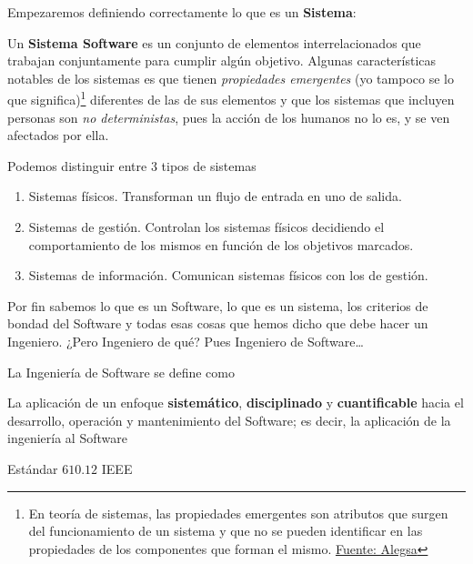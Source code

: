 \noindent Empezaremos definiendo correctamente lo que es un \textbf{Sistema}:

Un \textbf{Sistema Software} es un conjunto de elementos interrelacionados que trabajan conjuntamente para
cumplir algún objetivo. Algunas características notables de los sistemas es que tienen \textit{propiedades
emergentes} (yo tampoco se lo que significa)\footnote{En teoría de sistemas, las propiedades emergentes son 
atributos que surgen del funcionamiento de un sistema y que no se pueden identificar en las propiedades de los
componentes que forman el mismo. \href{https://www.alegsa.com.ar/Dic/propiedad_emergente.php}{Fuente: Alegsa}}
diferentes de las de sus elementos y que los sistemas que incluyen personas son \textit{no deterministas}, pues
la acción de los humanos no lo es, y se ven afectados por ella.

Podemos distinguir entre 3 tipos de sistemas

\begin{enumerate}
    \item Sistemas físicos. Transforman un flujo de entrada en uno de salida.
    \item Sistemas de gestión. Controlan los sistemas físicos decidiendo el comportamiento de los mismos en función
    de los objetivos marcados.
    \item Sistemas de información. Comunican sistemas físicos con los de gestión.
\end{enumerate}

Por fin sabemos lo que es un Software, lo que es un sistema, los criterios de bondad del Software y todas esas
cosas que hemos dicho que debe hacer un Ingeniero. ¿Pero Ingeniero de qué? Pues Ingeniero de Software\dots

\vspace*{2mm}

\noindent La Ingeniería de Software se define como

\begin{enfasis}
    La aplicación de un enfoque \textbf{sistemático}, \textbf{disciplinado} y \textbf{cuantificable} hacia el
    desarrollo, operación y mantenimiento del Software; es decir, la aplicación de la ingeniería al Software

     Estándar $610.12$ IEEE
\end{enfasis}

